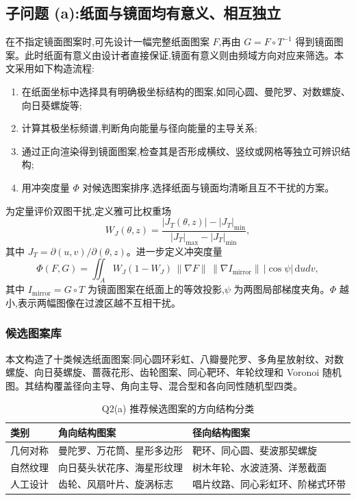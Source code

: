\documentclass[12pt, a4paper]{ctexart}
\begin{document}
\subsection{子问题 (a):纸面与镜面均有意义、相互独立}
在不指定镜面图案时,可先设计一幅完整纸面图案 $F$,再由 $G=F\circ T^{-1}$ 得到镜面图案。此时纸面有意义由设计者直接保证,镜面有意义则由频域方向对应来筛选。本文采用如下构造流程:
\begin{enumerate}
    \item 在纸面坐标中选择具有明确极坐标结构的图案,如同心圆、曼陀罗、对数螺旋、向日葵螺旋等;
    \item 计算其极坐标频谱,判断角向能量与径向能量的主导关系;
    \item 通过正向渲染得到镜面图案,检查其是否形成横纹、竖纹或网格等独立可辨识结构;
    \item 用冲突度量 $\Phi$ 对候选图案排序,选择纸面与镜面均清晰且互不干扰的方案。
\end{enumerate}

为定量评价双图干扰,定义雅可比权重场
\[
W_J(\theta,z)=
\frac{|J_T(\theta,z)|-|J_T|_{\min}}
{|J_T|_{\max}-|J_T|_{\min}},
\]
其中 $J_T=\partial(u,v)/\partial(\theta,z)$。进一步定义冲突度量
\[
\Phi(F,G)=\iint_A W_J(1-W_J)\,
\|\nabla F\|\,\|\nabla I_{\mathrm{mirror}}\|\,
|\cos\psi|\,\mathrm dudv,
\]
其中 $I_{\mathrm{mirror}}=G\circ T$ 为镜面图案在纸面上的等效投影,$\psi$ 为两图局部梯度夹角。$\Phi$ 越小,表示两幅图像在过渡区越不互相干扰。

\subsubsection{候选图案库}
本文构造了十类候选纸面图案:同心圆环彩虹、八瓣曼陀罗、多角星放射纹、对数螺旋、向日葵螺旋、蔷薇花形、齿轮图案、同心靶环、年轮纹理和 Voronoi 随机图。其结构覆盖径向主导、角向主导、混合型和各向同性随机型四类。

\begin{table}[htbp]
\centering
\caption{Q2(a) 推荐候选图案的方向结构分类}
\label{tab:q2-pattern-library}
\begin{tabularx}{\textwidth}{lXX}
\toprule
\textbf{类别} & \textbf{角向结构图案} & \textbf{径向结构图案} \\
\midrule
几何对称 & 曼陀罗、万花筒、星形多边形 & 靶环、同心圆、斐波那契螺旋 \\
自然纹理 & 向日葵头状花序、海星形纹理 & 树木年轮、水波涟漪、洋葱截面 \\
人工设计 & 齿轮、风扇叶片、旋涡标志 & 唱片纹路、同心彩虹环、阶梯式环带 \\
\bottomrule
\end{tabularx}
\end{table}
\end{document}
